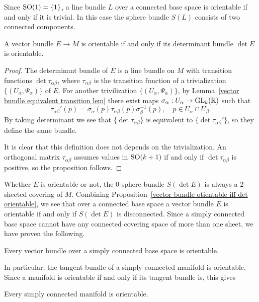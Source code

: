 \begin{remark}
Since $\mathrm{SO}(1)=\{1\}$, a line bundle $L$ over a connected base space is orientable if and only if it is trivial. In this case the sphere bundle $S(L)$ consists of two connected components.
\end{remark}
\begin{proposition}\label{vector bundle otientable iff det orientable}
A vector bundle $E\to M$ is orientable if and only if its determinant bundle $\det E$ is orientable.
\end{proposition}
\begin{proof}
The determinant bundle of $E$ is a line bundle on $M$ with transition functions $\det\tau_{\alpha\beta}$, where $\tau_{\alpha\beta}$ is the transition function of a 
trivialization $\{(U_\alpha,\varPsi_\alpha)\}$ of $E$. For another trivilization $\{(U_\alpha,\varPsi_\alpha)\}$, by Lemma~\ref{vector bundle equivalent transition lem} 
there exist maps $\sigma_\alpha:U_\alpha\to\mathrm{GL}_k(\mathbb{R})$ such that
\[\tau_{\alpha\beta}'(p)=\sigma_\alpha(p)\tau_{\alpha\beta}(p)\sigma^{-1}_{\beta}(p),\quad p\in U_\alpha\cap U_\beta.\]
By taking determinant we see that $\{\det\tau_{\alpha\beta}\}$ is equivalent to $\{\det\tau_{\alpha\beta}'\}$, so they define the same bundle.\par 
It is clear that this definition does not depends on the trivialization. An orthogonal matrix $\tau_{\alpha\beta}$ assumes values in $\mathrm{SO}(k+1)$ if and only if 
$\det\tau_{\alpha\beta}$ is positive, so the proposition follows.
\end{proof}
Whether $E$ is orientable or not, the $0$-sphere bundle $S(\det E)$ is always a $2$-sheeted covering of $M$. Combining Proposition~\ref{vector bundle otientable iff det orientable}, 
we see that over a connected base space a vector bundle $E$ is orientable if and only if $S(\det E)$ is disconnected. Since a simply connected base space cannot have 
any connected covering space of more than one sheet, we have proven the following.
\begin{proposition}\label{vector bundle on simply connected orientable}
Every vector bundle over a simply connected base space is orientable.
\end{proposition}
In particular, the tangent bundle of a simply connected manifold is orientable. Since a manifold is orientable if and only if its tangent bundle is, this gives
\begin{corollary}
Every simply connected manifold is orientable.
\end{corollary}
